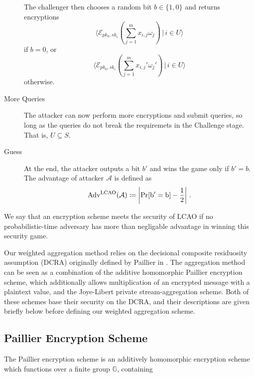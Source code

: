 \documentclass[twocolumn]{autart}
\theoremstyle{definition}
\begin{document}
\begin{description}
    The challenger then chooses a random bit $b \in \{1,0\}$ and returns encryptions 
    \begin{equation*}
        \langle\mathcal{E}_{pk_0,sk_i}(\sum^m_{j=1}x_{i,j}\omega_j)\,|\,i\in U\rangle
    \end{equation*}
    if $b=0$, or 
    \begin{equation*}
        \langle\mathcal{E}_{pk_0,sk_i}(\sum^m_{j=1}x_{i,j}'\omega_j')\,|\,i\in U\rangle
    \end{equation*}
    otherwise.
    \item[More Queries] The attacker can now perform more encryptions and submit queries, so long as the queries do not break the requiremets in the Challenge stage. That is, $U \subseteq S$.
    \item[Guess] At the end, the attacker outputs a bit $b'$ and wins the game only if $b' = b$. The advantage of attacker $\mathcal{A}$ is defined as
    \begin{equation*}
        \operatorfont{Adv}^{LCAO}(\mathcal{A}) \coloneqq \left\lvert \operatorfont{Pr}[b'=b] - \frac{1}{2}\right\rvert\,.
    \end{equation*} 
\end{description}

We say that an encryption scheme meets the security of LCAO if no probabilistic-time adversary has more than negligable advantage in winning this security game.


Our weighted aggregation method relies on the decisional composite residuosity assumption (DCRA) originally defined by Paillier in \cite{paillierPublicKeyCryptosystemsBased1999}. The aggregation method can be seen as a combination of the additive homomorphic Paillier encryption scheme, which additionally allows multiplication of an encrypted message with a plaintext value, and the Joye-Libert private stream-aggregation scheme. Both of these schemes base their security on the DCRA, and their descriptions are given briefly below before defining our weighted aggregation scheme.

\subsection{Paillier Encryption Scheme}
The Paillier encryption scheme is an additively homomorphic encryption scheme which functions over a finite group $\mathbb{G}$, containing 

\end{document}
